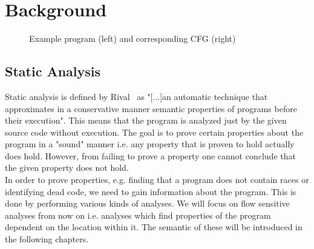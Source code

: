 
\chapter{Background}\label{chapter:background}

\begin{figure}
  \centering
  \begin{subfigure}{.35\textwidth}
    \centering
    
  \end{subfigure}
  \begin{subfigure}{.35\textwidth}
    \centering
  \end{subfigure}
  \caption{Example program (left) and corresponding CFG (right)}
  \label{fig:example_cfg}
\end{figure}

  \section{Static Analysis}
  Static analysis is defined by Rival~\cite{rival2020introduction} as "[...]an automatic technique that approximates in a conservative manner semantic properties of programs before their execution". This means that the program is analyzed just by the given source code without execution. The goal is to prove certain properties about the program in a "sound" manner i.e. any property that is proven to hold actually does hold. However, from failing to prove a property one cannot conclude that the given property does not hold.\\
  In order to prove properties, e.g. finding that a program does not contain races or identifying dead code, we need to gain information about the program. This is done by performing various kinds of analyses. We will focus on flow sensitive analyses from now on i.e. analyses which find properties of the program dependent on the location within it. The semantic of these will be introduced in the following chapters.
  
